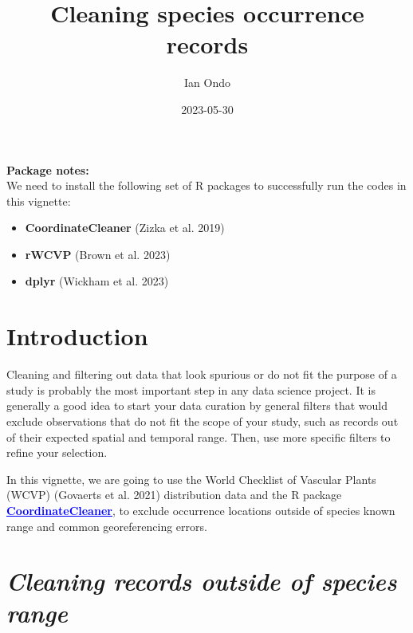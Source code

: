 \documentclass[
]{article}
\title{Cleaning species occurrence records}
\author{Ian Ondo}
\date{2023-05-30}
\providecommand{\tightlist}{%
  \setlength{\itemsep}{0pt}\setlength{\parskip}{0pt}}
\begin{document}
\maketitle

{
\setcounter{tocdepth}{2}
\tableofcontents
}
\begin{warningbox}

\textbf{Package notes:}\\
We need to install the following set of R packages to successfully run
the codes in this vignette:

\begin{itemize}
\tightlist
\item
  \textbf{CoordinateCleaner} (Zizka et al. 2019)
\item
  \textbf{rWCVP} (Brown et al. 2023)
\item
  \textbf{dplyr} (Wickham et al. 2023)
\end{itemize}

\end{warningbox}

\hypertarget{introduction}{%
\section{Introduction}\label{introduction}}

Cleaning and filtering out data that look spurious or do not fit the
purpose of a study is probably the most important step in any data
science project. It is generally a good idea to start your data curation
by general filters that would exclude observations that do not fit the
scope of your study, such as records out of their expected spatial and
temporal range. Then, use more specific filters to refine your
selection.

In this vignette, we are going to use the World Checklist of Vascular
Plants (WCVP) (Govaerts et al. 2021) distribution data and the R package
\href{https://cran.r-project.org/web/packages/CoordinateCleaner/CoordinateCleaner.pdf}{\textbf{\textcolor{blue}{\underline{CoordinateCleaner}}}},
to exclude occurrence locations outside of species known range and
common georeferencing errors.

\hypertarget{cleaning-records-outside-of-species-range}{%
\section{\texorpdfstring{\emph{Cleaning records outside of species
range}}{Cleaning records outside of species range}}\label{cleaning-records-outside-of-species-range}}
\end{document}
